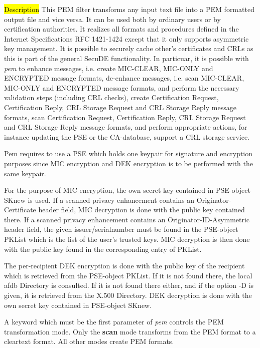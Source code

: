 \hl{Description}
This PEM filter transforms any input text file into a PEM formatted output file 
and vice versa. It can be used both by ordinary users or by certification
authorities. It realizes all formats 
and procedures defined in the Internet Specifications RFC 1421-1424 
except that it only supports asymmetric key management. It is
possible to securely cache other's certificates and CRLs as this 
is part of the general SecuDE functionality. In particuar, it is possible
with {\em pem} to
\bi
   \m enhance messages, i.e. create MIC-CLEAR, MIC-ONLY and
      ENCRYPTED message formats,
   \m de-enhance messages, i.e. scan MIC-CLEAR, MIC-ONLY and
      ENCRYPTED message formats, and perform the necessary
      validation steps (including CRL checks),
   \m create Certification Request, Certification Reply, CRL Storage
      Request and CRL Storage Reply message formats,
   \m scan Certification Request, Certification Reply, CRL Storage
      Request and CRL Storage Reply message formats, and perform
      appropriate actions, for instance updating the PSE or
      the CA-database,
   \m support a CRL storage service.
\ei

Pem requires to use a PSE which holds one keypair for signature and encryption purposes since
MIC encryption and DEK encryption is to be performed with the same keypair. 

For the purpose of
MIC encryption, the own secret key contained in PSE-object SKnew is used. If a scanned
privacy enhancement contains an Originator-Certificate header field, MIC decryption
is done with the public key contained there. If a scanned privacy enhancement contains an 
Originator-ID-Asymmetric header field, the given issuer/serialnumber must be found in
the PSE-object PKList which is the list of the user's trusted keys. MIC decryption
is then done with the public key found in the corresponding entry of PKList.

The per-recipient DEK encryption is done with the public key of the recipient which is retrieved
from the PSE-object PKList. If it is not found there, the local afdb Directory is consulted.
If it is not found there either, and if the option -D is given, it is retrieved from
the X.500 Directory. DEK decryption is done with the own secret key contained in PSE-object
SKnew. 

A keyword which must be the first parameter of {\em pem} controls the PEM transformation mode.
Only the {\bf scan} mode transforms from the PEM format to a cleartext format. All other
modes create PEM formats.  

